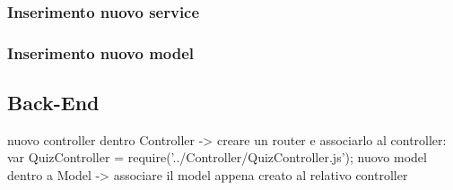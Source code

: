 \subsubsection{Inserimento nuovo service}

\subsubsection{Inserimento nuovo model}

\subsection{Back-End}

nuovo controller dentro Controller -> creare un router e associarlo al controller: var QuizController = require('../Controller/QuizController.js');
nuovo model dentro a Model -> associare il model appena creato al relativo controller